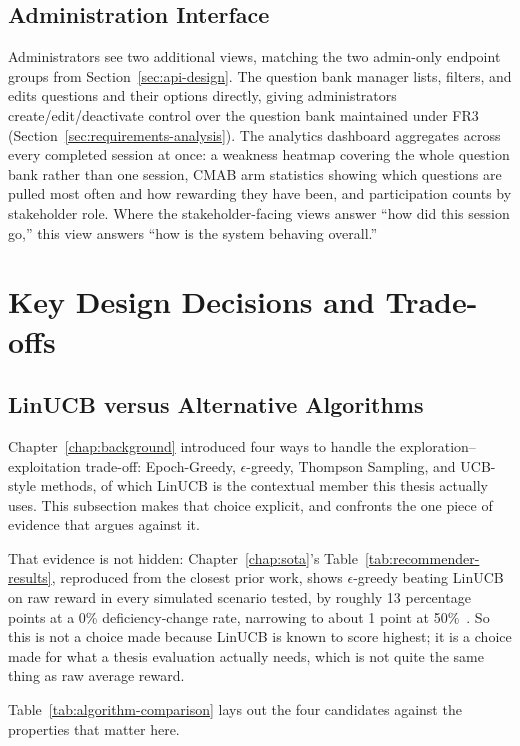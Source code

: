 \documentclass[a4paper, 12pt, oneside, openany, BCOR1cm,toc=chapterentrywithdots]{scrbook}
\begin{document}
\subsection{Administration Interface}

Administrators see two additional views, matching the two admin-only endpoint groups from
Section~\ref{sec:api-design}. The question bank manager lists, filters, and edits questions and
their options directly, giving administrators create/edit/deactivate control over the question
bank maintained under FR3 (Section~\ref{sec:requirements-analysis}). The analytics dashboard aggregates across every
completed session at once: a weakness heatmap covering the whole question bank rather than one
session, CMAB arm statistics showing which questions are pulled most often and how rewarding they
have been, and participation counts by stakeholder role. Where the stakeholder-facing views
answer ``how did this session go,'' this view answers ``how is the system behaving overall.''

\section{Key Design Decisions and Trade-offs}
\subsection{LinUCB versus Alternative Algorithms}

Chapter~\ref{chap:background} introduced four ways to handle the exploration--exploitation
trade-off: Epoch-Greedy, $\epsilon$-greedy, Thompson Sampling, and UCB-style methods, of which
LinUCB is the contextual member this thesis actually uses. This subsection makes that choice
explicit, and confronts the one piece of evidence that argues against it.

That evidence is not hidden: Chapter~\ref{chap:sota}'s Table~\ref{tab:recommender-results},
reproduced from the closest prior work, shows $\epsilon$-greedy beating LinUCB on raw reward in
every simulated scenario tested, by roughly 13 percentage points at a 0\% deficiency-change rate,
narrowing to about 1 point at 50\%~\cite{datsogiannis2025recommender}. So this is not a choice
made because LinUCB is known to score highest; it is a choice made for what a thesis evaluation
actually needs, which is not quite the same thing as raw average reward.

Table~\ref{tab:algorithm-comparison} lays out the four candidates against the properties that
matter here.
\end{document}
